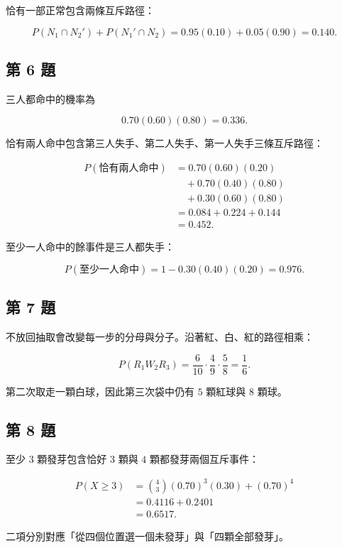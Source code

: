 \documentclass[11pt,a4paper]{article}
\begin{document}
恰有一部正常包含兩條互斥路徑：

\[
P(N_1\cap N_2')+P(N_1'\cap N_2)
=0.95(0.10)+0.05(0.90)
=\boxed{0.140}.
\]

\subsection{第 6 題}\label{ux7b2c-6-ux984c}

三人都命中的機率為

\[
0.70(0.60)(0.80)=\boxed{0.336}.
\]

恰有兩人命中包含第三人失手、第二人失手、第一人失手三條互斥路徑：

\[
\begin{aligned}
P(\text{恰有兩人命中})
&=0.70(0.60)(0.20)\\
&\quad+0.70(0.40)(0.80)\\
&\quad+0.30(0.60)(0.80)\\
&=0.084+0.224+0.144\\
&=\boxed{0.452}.
\end{aligned}
\]

至少一人命中的餘事件是三人都失手：

\[
P(\text{至少一人命中})
=1-0.30(0.40)(0.20)
=\boxed{0.976}.
\]

\subsection{第 7 題}\label{ux7b2c-7-ux984c}

不放回抽取會改變每一步的分母與分子。沿著紅、白、紅的路徑相乘：

\[
P(R_1W_2R_3)
=\frac6{10}\cdot\frac4{9}\cdot\frac5{8}
=\boxed{\frac16}.
\]

第二次取走一顆白球，因此第三次袋中仍有 \(5\) 顆紅球與 \(8\) 顆球。

\subsection{第 8 題}\label{ux7b2c-8-ux984c}

至少 \(3\) 顆發芽包含恰好 \(3\) 顆與 \(4\) 顆都發芽兩個互斥事件：

\[
\begin{aligned}
P(X\ge3)
&=\binom43(0.70)^3(0.30)+(0.70)^4\\
&=0.4116+0.2401\\
&=\boxed{0.6517}.
\end{aligned}
\]

二項分別對應「從四個位置選一個未發芽」與「四顆全部發芽」。
\end{document}
